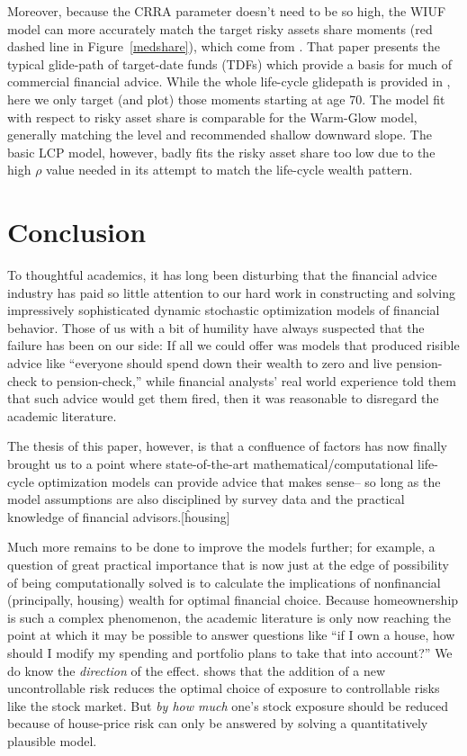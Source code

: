 \documentclass{article}
\newcommand{\CRRA}{\rho}
\begin{document}
Moreover, because the CRRA parameter doesn't need to be so high, the WIUF model can more accurately match the target risky assets share moments (red dashed line in Figure~\ref{medshare}), which come from \cite{Aboagye2024}.
That paper presents the typical glide-path of target-date funds (TDFs) which provide a basis for much of commercial financial advice.
While the whole life-cycle glidepath is provided in \cite{Aboagye2024}, here we only target (and plot) those moments starting at age 70.
The model fit with respect to risky asset share is comparable for the Warm-Glow model, generally matching the level and recommended shallow downward slope.
The basic LCP model, however, badly fits the risky asset share too low due to the high $\CRRA$ value needed in its attempt to match the life-cycle wealth pattern.

\section{Conclusion}

To thoughtful academics, it has long been disturbing that the financial advice industry has paid so little attention to our hard work in constructing and solving impressively sophisticated dynamic stochastic optimization models of financial behavior.
Those of us with a bit of humility have always suspected that the failure has been on our side: If all we could offer was models that produced risible advice like ``everyone should spend down their wealth to zero and live pension-check to pension-check,'' while financial analysts' real world experience told them that such advice would get them fired, then it was reasonable to disregard the academic literature.

The thesis of this paper, however, is that a confluence of factors has now finally brought us to a point where state-of-the-art mathematical/computational life-cycle optimization models can provide advice that makes sense-- so long as the model assumptions are also disciplined by survey data and the practical knowledge of financial advisors.[\^housing]

Much more remains to be done to improve the models further; for example, a question of great practical importance that is now just at the edge of possibility of being computationally solved is to calculate the implications of nonfinancial (principally, housing) wealth for optimal financial choice.
Because homeownership is such a complex phenomenon, the academic literature is only now reaching the point at which it may be possible to answer questions like ``if I own a house, how should I modify my spending and portfolio plans to take that into account?''
We do know the \textit{direction} of the effect.
\cite{kimballStandardRA} shows that the addition of a new uncontrollable risk reduces the optimal choice of exposure to controllable risks like the stock market.
But \textit{by how much} one's stock exposure should be reduced because of house-price risk can only be answered by solving a quantitatively plausible model.
\end{document}
